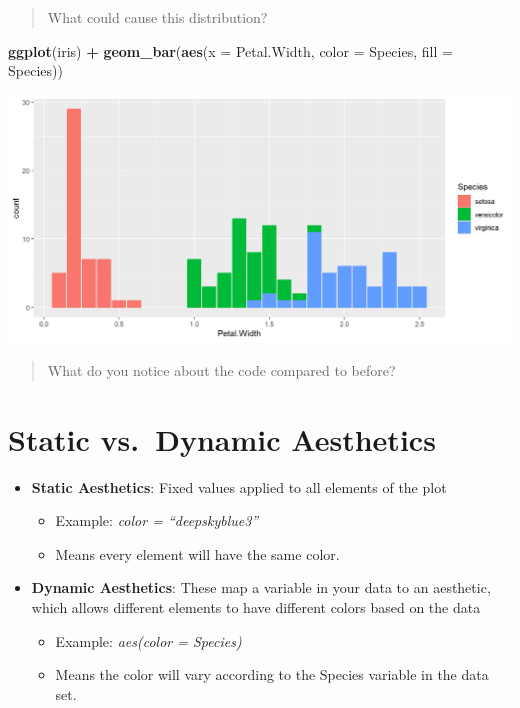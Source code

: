 \documentclass[
]{book}
\newenvironment{Shaded}{\begin{snugshade}}{\end{snugshade}}
\newcommand{\AttributeTok}[1]{\textcolor[rgb]{0.13,0.29,0.53}{#1}}
\newcommand{\FunctionTok}[1]{\textcolor[rgb]{0.13,0.29,0.53}{\textbf{#1}}}
\newcommand{\NormalTok}[1]{#1}
\newcommand{\SpecialCharTok}[1]{\textcolor[rgb]{0.81,0.36,0.00}{\textbf{#1}}}
\providecommand{\tightlist}{%
  \setlength{\itemsep}{0pt}\setlength{\parskip}{0pt}}
\begin{document}
\begin{quote}
What could cause this distribution?
\end{quote}

\begin{Shaded}
\begin{Highlighting}[]
\FunctionTok{ggplot}\NormalTok{(iris) }\SpecialCharTok{+} 
  \FunctionTok{geom\_bar}\NormalTok{(}\FunctionTok{aes}\NormalTok{(}\AttributeTok{x =}\NormalTok{ Petal.Width, }\AttributeTok{color =}\NormalTok{ Species, }\AttributeTok{fill =}\NormalTok{ Species))}
\end{Highlighting}
\end{Shaded}

\begin{flushleft}\includegraphics{_main_files/figure-html/unnamed-chunk-33-1} \end{flushleft}

\begin{quote}
What do you notice about the code compared to before?
\end{quote}

\section{Static vs.~Dynamic Aesthetics}\label{static-vs.-dynamic-aesthetics}

\begin{itemize}
\tightlist
\item
  \textbf{Static Aesthetics}: Fixed values applied to all elements of the plot

  \begin{itemize}
  \tightlist
  \item
    Example: \emph{color = ``deepskyblue3''}
  \item
    Means every element will have the same color.
  \end{itemize}
\item
  \textbf{Dynamic Aesthetics}: These map a variable in your data to an aesthetic, which allows different elements to have different colors based on the data

  \begin{itemize}
  \tightlist
  \item
    Example: \emph{aes(color = Species)}
  \item
    Means the color will vary according to the Species variable in the data set.
  \end{itemize}
\end{itemize}
\end{document}
